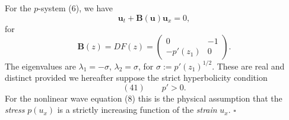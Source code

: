 \begin{example}
\label{ex:p-system-strict-hyperbolicity}
For the $p$-system (6), we have
$$\mathbf{u}_t + \mathbf{B}(\mathbf{u})\mathbf{u}_x = 0,$$
for
$$\mathbf{B}(z) = DF(z) = \begin{pmatrix} 0 & -1 \\ -p'(z_1) & 0 \end{pmatrix}.$$
The eigenvalues are $\lambda_1=-\sigma$, $\lambda_2=\sigma$, for $\sigma:=p'(z_1)^{1/2}$. These are real and distinct provided we hereafter suppose the strict hyperbolicity condition
$$(41) \qquad p'>0.$$
For the nonlinear wave equation (8) this is the physical assumption that the \textit{stress} $p(u_x)$ is a strictly increasing function of the \textit{strain} $u_x$. $\square$
\end{example}

